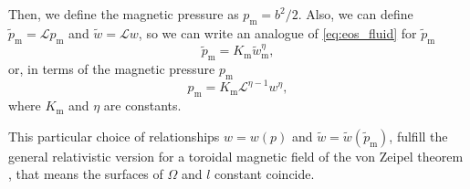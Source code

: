 \documentclass{aa}
\begin{document}
Then, we define the magnetic pressure as $p_{\mathrm{m}} = b^2/2$. Also, we can define $\tilde{p}_{\mathrm{m}} = \mathcal{L} p_{\mathrm{m}}$ and $\tilde{w} = \mathcal{L} w$, so we can write an analogue of \eqref{eq:eos_fluid} for $\tilde{p}_{\mathrm{m}}$
\begin{equation}\label{eq:eos_mag_tilde}
\tilde{p}_{\mathrm{m}} = K_{\mathrm{m}} \tilde{w}_{\mathrm{m}}^{\eta},
\end{equation}
or, in terms of the magnetic pressure $p_{\mathrm{m}}$
\begin{equation}\label{eq:eos_mag}
p_{\mathrm{m}} = K_{\mathrm{m}} \mathcal{L}^{\eta-1} w^{\eta},
\end{equation}
where $K_{\mathrm{m}}$ and $\eta$ are constants.

This particular choice of relationships $w = w(p)$ and $\tilde{w} = \tilde{w}(\tilde{p}_{\mathrm{m}})$, fulfill the general relativistic version for a toroidal magnetic field of the von Zeipel theorem \citep{vonZeipel1924, Zanotti2015}, that means the surfaces of $\Omega$ and $l$ constant coincide.
\end{document}
